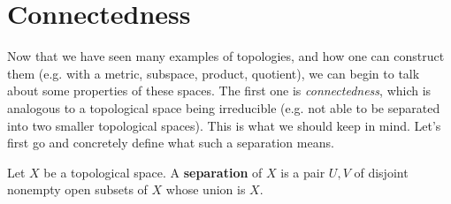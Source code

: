 \section{Connectedness} 

  Now that we have seen many examples of topologies, and how one can construct them (e.g. with a metric, subspace, product, quotient), we can begin to talk about some properties of these spaces. The first one is \textit{connectedness}, which is analogous to a topological space being irreducible (e.g. not able to be separated into two smaller topological spaces). This is what we should keep in mind. Let's first go and concretely define what such a separation means.

  \begin{definition}[Separation]
    Let $X$ be a topological space. A \textbf{separation} of $X$ is a pair $U, V$ of disjoint nonempty open subsets of $X$ whose union is $X$. 
  \end{definition}

